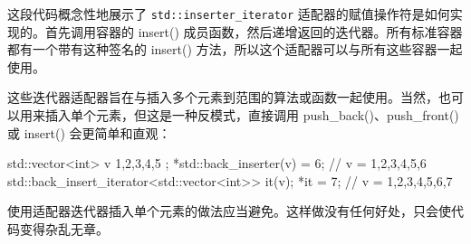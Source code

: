 这段代码概念性地展示了 \verb|std::inserter_iterator| 适配器的赋值操作符是如何实现的。首先调用容器的 insert() 成员函数，然后递增返回的迭代器。所有标准容器都有一个带有这种签名的 insert() 方法，所以这个适配器可以与所有这些容器一起使用。


这些迭代器适配器旨在与插入多个元素到范围的算法或函数一起使用。当然，也可以用来插入单个元素，但这是一种反模式，直接调用 push\_back()、push\_front() 或 insert() 会更简单和直观：

\begin{cpp}
std::vector<int> v{ 1,2,3,4,5 };
*std::back_inserter(v) = 6; // v = {1,2,3,4,5,6}
std::back_insert_iterator<std::vector<int>> it(v);
*it = 7;                    // v = {1,2,3,4,5,6,7}
\end{cpp}

使用适配器迭代器插入单个元素的做法应当避免。这样做没有任何好处，只会使代码变得杂乱无章。

